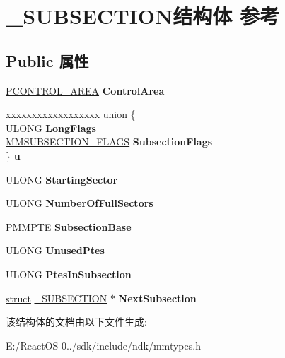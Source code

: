 \hypertarget{struct___s_u_b_s_e_c_t_i_o_n}{}\section{\+\_\+\+S\+U\+B\+S\+E\+C\+T\+I\+O\+N结构体 参考}
\label{struct___s_u_b_s_e_c_t_i_o_n}
\subsection*{Public 属性}
\begin{DoxyCompactItemize}
\item 
\mbox{\label{struct___s_u_b_s_e_c_t_i_o_n_aad64adeff097260f21058c214f161663}} 
\hyperlink{struct___c_o_n_t_r_o_l___a_r_e_a}{P\+C\+O\+N\+T\+R\+O\+L\+\_\+\+A\+R\+EA} {\bfseries Control\+Area}
\item 
\mbox{\label{struct___s_u_b_s_e_c_t_i_o_n_a1d8f32a88bee7238fad180b79842581e}} 
\begin{tabbing}
xx\=xx\=xx\=xx\=xx\=xx\=xx\=xx\=xx\=\kill
union \{\\
\>ULONG {\bfseries LongFlags}\\
\>\hyperlink{struct___m_m_s_u_b_s_e_c_t_i_o_n___f_l_a_g_s}{MMSUBSECTION\_FLAGS} {\bfseries SubsectionFlags}\\
\} {\bfseries u}\\

\end{tabbing}\item 
\mbox{\label{struct___s_u_b_s_e_c_t_i_o_n_aae865233fbf920447981ee21116afdbe}} 
U\+L\+O\+NG {\bfseries Starting\+Sector}
\item 
\mbox{\label{struct___s_u_b_s_e_c_t_i_o_n_a5edbba89b07d8f17b71bd07b7b1f1256}} 
U\+L\+O\+NG {\bfseries Number\+Of\+Full\+Sectors}
\item 
\mbox{\label{struct___s_u_b_s_e_c_t_i_o_n_adc68aaaf8068775b74e0840c78076ac4}} 
\hyperlink{struct___m_m_p_t_e}{P\+M\+M\+P\+TE} {\bfseries Subsection\+Base}
\item 
\mbox{\label{struct___s_u_b_s_e_c_t_i_o_n_a600fd51cd8f5d7f3f7e13557a92964fe}} 
U\+L\+O\+NG {\bfseries Unused\+Ptes}
\item 
\mbox{\label{struct___s_u_b_s_e_c_t_i_o_n_aa26fa67cefa4b93eeb9167da58cacd07}} 
U\+L\+O\+NG {\bfseries Ptes\+In\+Subsection}
\item 
\mbox{\label{struct___s_u_b_s_e_c_t_i_o_n_ae0c17e41e44c9d3d280593632f92c82d}} 
\hyperlink{interfacestruct}{struct} \hyperlink{struct___s_u_b_s_e_c_t_i_o_n}{\+\_\+\+S\+U\+B\+S\+E\+C\+T\+I\+ON} $\ast$ {\bfseries Next\+Subsection}
\end{DoxyCompactItemize}


该结构体的文档由以下文件生成\+:\begin{DoxyCompactItemize}
\item 
E\+:/\+React\+O\+S-\/0../sdk/include/ndk/mmtypes.\+h\end{DoxyCompactItemize}
